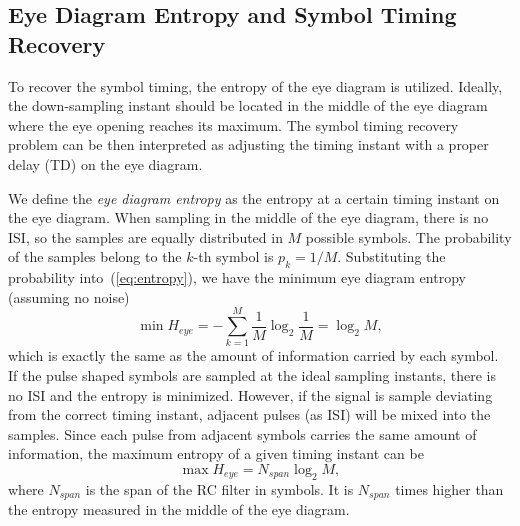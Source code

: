 \documentclass[journal,comsoc]{IEEEtran}
\begin{document}
\subsection{Eye Diagram Entropy and Symbol Timing Recovery}
\label{sec:eye_entp}
To recover the symbol timing, the entropy of the eye diagram is utilized. 
Ideally, the down-sampling instant should be located in the middle of the eye diagram where the eye opening reaches its maximum.
The symbol timing recovery problem can be then interpreted as adjusting the timing instant with a proper delay (TD) on the eye diagram.

We define the \textit{eye diagram entropy} as the entropy at a certain timing instant on the eye diagram.
When sampling in the middle of the eye diagram, there is no ISI, 
so the samples are equally distributed in \(M\) possible symbols.
The probability of the samples belong to the $k$-th symbol is \(p_k=1/M\).
Substituting the probability into~(\ref{eq:entropy}), we have the minimum eye diagram entropy (assuming no noise)
\begin{equation}
\min{H_{eye}} =  - \sum\limits_{k = 1}^M {{\frac{1}{M}}\log_2 {\frac{1}{M}}}=\log_2 {M},
\label{eq:entropy_mid}
\end{equation}
which is exactly the same as the amount of information carried by each symbol.
If the pulse shaped symbols are sampled at the ideal sampling instants, 
there is no ISI and the entropy is minimized.
However, if the signal is sample deviating from the correct timing instant, adjacent pulses (as ISI) will be mixed into the samples.
Since each pulse from adjacent symbols carries the same amount of information, the maximum entropy of a given timing instant can be
\begin{equation}
\max{H_{eye}} =  N_{span}\log_2 {M},
\label{eq:entropy_neb}
\end{equation}
where \(N_{span}\) is the span of the RC filter in symbols.
It is \(N_{span}\) times higher than the entropy measured in the middle of the eye diagram.
\end{document}
